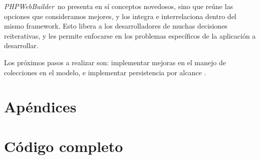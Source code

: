 \documentclass[a4paper,10pt,draft]{article}
\newcommand{\PWB}{\emph{PHPWebBuilder}}
\begin{document}
\PWB\ no presenta en sí conceptos novedosos, sino que reúne las opciones que consideramos mejores, y los integra e interrelaciona dentro del mismo framework. Esto libera a los desarrolladores de muchas decisiones reiterativas, y les permite enfocarse en los problemas específicos de la aplicación a desarrollar.

Los próximos pasos a realizar son: implementar mejoras en el manejo de colecciones en el modelo, e implementar persistencia por alcance \cite{jpox} \cite{jdo}.







\setcounter{section}{0}
\section*{Apéndices}
\section{Código completo}

\begin{lgrind}

\end{lgrind}

\begin{lgrind}

\end{lgrind}
\end{document}

